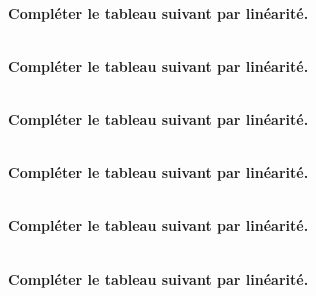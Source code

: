 \exercice \diff[1] \\
\textbf{Compléter le tableau suivant par linéarité.}

\newpage%
\exercice \diff[2]  \\
\textbf{Compléter le tableau suivant par linéarité.}

\exercice \diff[2] \\
\textbf{Compléter le tableau suivant par linéarité.}

\exercice \diff[2] \\
\textbf{Compléter le tableau suivant par linéarité.}


\exercice \diff[2] \\
\textbf{Compléter le tableau suivant par linéarité.}

\exercice \diff[2] \\
\textbf{Compléter le tableau suivant par linéarité.}





